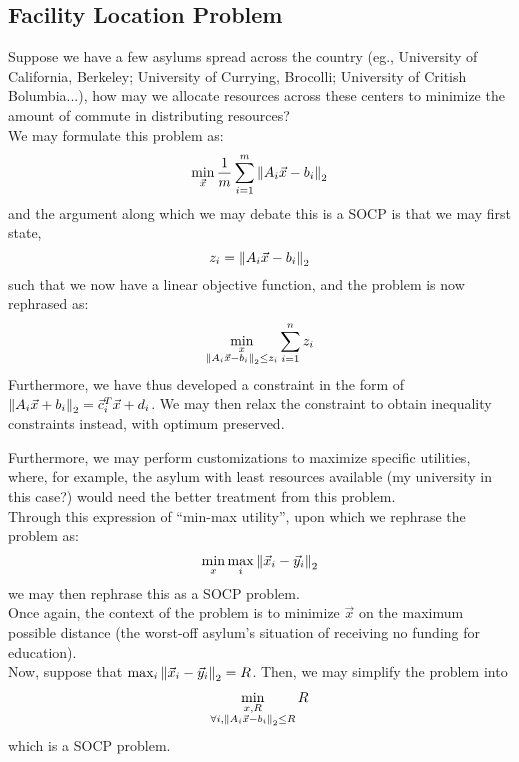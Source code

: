 \subsection{Facility Location Problem}
Suppose we have a few asylums spread across the country (eg., University of California, Berkeley; University of Currying, Brocolli; University of Critish Bolumbia...), how may we allocate resources across these centers to minimize the amount of commute in distributing resources? \\
We may formulate this problem as:
\[
    \min_{\vec{x}} \frac{1}{m} \sum_{i = 1}^m {\| A_i \vec{x} - b_i \|}_{2}^{}
\]
and the argument along which we may debate this is a SOCP is that we may first state,
\[
    z_i = {\| A_i \vec{x} - b_i \|}_{2}^{}
\]
such that we now have a linear objective function, and the problem is now rephrased as:
\[
    \min_{
        \substack{
            x \\
            {\| A_i \vec{x} - b_i \|}_{2}^{} \leq z_i
        }
    } \sum_{i = 1}^n z_i
\]
Furthermore, we have thus developed a constraint in the form of ${\| A_i \vec{x} + b_i \|}_{2}^{} = \vec{c}_i^T \vec{x} + d_i$.
We may then relax the constraint to obtain inequality constraints instead, with optimum preserved.

Furthermore, we may perform customizations to maximize specific utilities, where, for example, the asylum with least resources available (my university in this case?) would need the better treatment from this problem. \\
Through this expression of ``min-max utility'', upon which we rephrase the problem as:
\[
    \min_x \max_i {\| \vec{x}_i - \vec{y}_i \|}_{2}^{}
\]
we may then rephrase this as a SOCP problem. \\
Once again, the context of the problem is to minimize $\vec{x}$ on the maximum possible distance (the worst-off asylum's situation of receiving no funding for education). \\
Now, suppose that $\max_i {\| \vec{x}_i - \vec{y}_i \|}_{2}^{} = R$. Then, we may simplify the problem into
\begin{align*}
    \min_{
        \substack{
            x, R \\
            \forall i, {\| A_i \vec{x} - b_i \|}_{2}^{} \leq R
        }
    } R
\end{align*}
which is a SOCP problem.
